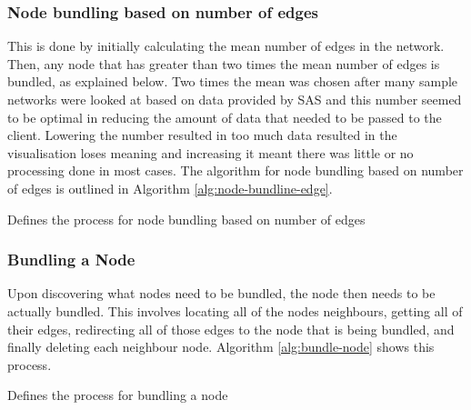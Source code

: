 \documentclass[../dissertation.tex]{subfiles}
\begin{document}
\subsubsection{Node bundling based on number of edges}

This is done by initially calculating the mean number of edges in the network. Then, any node that has greater than two times the mean number of edges is bundled, as explained below. Two times the mean was chosen after many sample networks were looked at based on data provided by SAS and this number seemed to be optimal in reducing the amount of data that needed to be passed to the client. Lowering the number resulted in too much data resulted in the visualisation loses meaning and increasing it meant there was little or no processing done in most cases. The algorithm for node bundling based on number of edges is outlined in Algorithm \ref{alg:node-bundline-edge}.

\begin{algorithm}[H]
\caption{Defines the process for node bundling based on number of edges}
\label{alg:node-bundline-edge}
\begin{algorithmic}
 
\ENDFOR
{}
    \ENDIF
\ENDFOR
{} 
      
\ENDFOR
\end{algorithmic}
\end{algorithm}

\subsubsection{Bundling a Node}

Upon discovering what nodes need to be bundled, the node then needs to be actually bundled. This involves locating all of the nodes neighbours, getting all of their edges, redirecting all of those edges to the node that is being bundled, and finally deleting each neighbour node. Algorithm \ref{alg:bundle-node} shows this process.

\begin{algorithm}[H]
\caption{Defines the process for bundling a node}
\label{alg:bundle-node}
\begin{algorithmic}
 
        \ELSE
        \ENDIF
    \ENDFOR
\ENDFOR
{}
\ENDFOR
\end{algorithmic}
\end{algorithm}
\end{document}

